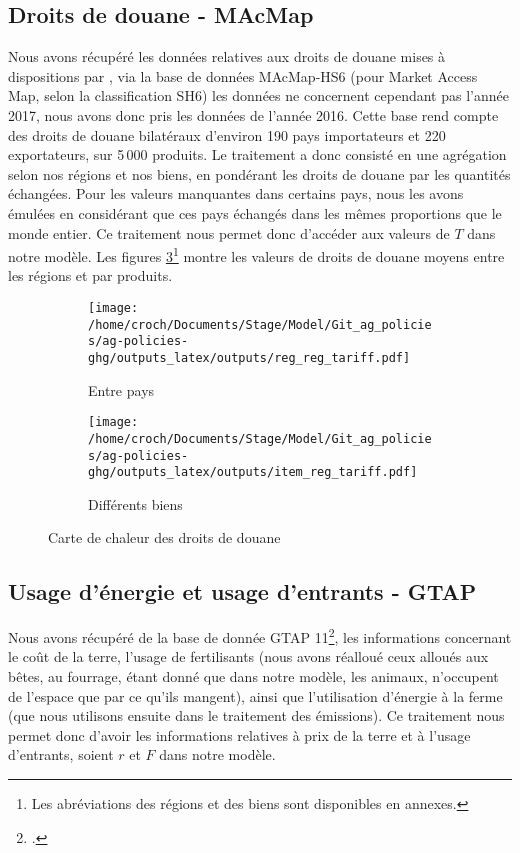 \subsection{Droits de douane - MAcMap}

Nous avons récupéré les données relatives aux droits de douane mises à dispositions par \cite{Guimbard2012}, via la base de données MAcMap-HS6 (pour Market Access Map, selon la classification SH6) les données ne concernent cependant pas l'année 2017, nous avons donc pris les données de l'année 2016. Cette base rend compte des droits de douane bilatéraux d'environ 190 pays importateurs et 220 exportateurs, sur 5\,000 produits. Le traitement a donc consisté en une agrégation selon nos régions et nos biens, en pondérant les droits de douane par les quantités échangées. Pour les valeurs manquantes dans certains pays, nous les avons émulées en considérant que ces pays échangés dans les mêmes proportions que le monde entier. Ce traitement nous permet donc d'accéder aux valeurs de $T$ dans notre modèle. Les figures \ref{fig:macmap}\footnote{Les abréviations des régions et des biens sont disponibles en annexes.} montre les valeurs de droits de douane moyens entre les régions et par produits.

\begin{figure}[h!]
    \centering
    \begin{subfigure}[b]{0.495\textwidth}
        \centering
        \texttt{[image: /home/croch/Documents/Stage/Model/Git\_ag\_policies/ag-policies-ghg/outputs\_latex/outputs/reg\_reg\_tariff.pdf]}
        \caption{Entre pays}
        \label{fig:reg_reg}
    \end{subfigure}
    \begin{subfigure}[b]{0.495\textwidth}
        \centering
        \texttt{[image: /home/croch/Documents/Stage/Model/Git\_ag\_policies/ag-policies-ghg/outputs\_latex/outputs/item\_reg\_tariff.pdf]}
        \caption{Différents biens}
        \label{fig:item_reg}
    \end{subfigure}
    \caption{Carte de chaleur des droits de douane}
    \label{fig:macmap}
\end{figure}


\subsection{Usage d'énergie et usage d'entrants - GTAP}

Nous avons récupéré de la base de donnée GTAP 11\footcite{Aguiar2022}, les informations concernant le coût de la terre, l'usage de fertilisants (nous avons réalloué ceux alloués aux bêtes, au fourrage, étant donné que dans notre modèle, les animaux, n'occupent de l'espace que par ce qu'ils mangent), ainsi que l'utilisation d'énergie à la ferme (que nous utilisons ensuite dans le traitement des émissions). Ce traitement nous permet donc d'avoir les informations relatives à prix de la terre et à l'usage d'entrants, soient $r$ et $F$ dans notre modèle.


